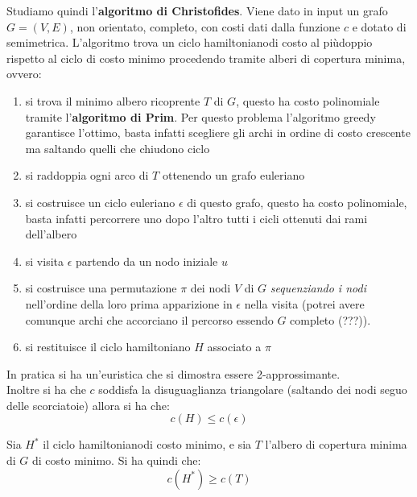 																      	Studiamo quindi l'\textbf{algoritmo di Christofides}. Viene dato in input un
																      	grafo $G=(V,E)$, non orientato, completo, con costi dati dalla funzione $c$ e
																      	dotato di semimetrica. 
																      	L'algoritmo trova un ciclo hamiltonianodi costo al piùdoppio rispetto al ciclo
																      	di costo minimo procedendo tramite alberi di copertura minima, ovvero:
																      	\begin{enumerate}
																      		\item si trova il minimo albero ricoprente $T$ di $G$, questo ha costo
																      		      polinomiale tramite l'\textbf{algoritmo di Prim}. Per questo problema
																      		      l’algoritmo greedy garantisce l’ottimo, basta infatti scegliere gli archi in
																      		      ordine di costo crescente ma saltando quelli che chiudono ciclo
																      		\item si raddoppia ogni arco di $T$ ottenendo un grafo euleriano
																      		\item si costruisce un ciclo euleriano $\epsilon$ di questo grafo, questo ha
																      		      costo polinomiale, basta infatti percorrere uno dopo l’altro tutti i cicli
																      		      ottenuti dai rami dell’albero 
																      		\item si visita $\epsilon$ partendo da un nodo iniziale $u$
																      		\item si costruisce una permutazione $\pi$ dei nodi $V$ di $G$
																      		      \textit{sequenziando i nodi} nell’ordine della loro prima apparizione in
																      		      $\epsilon$ nella visita (potrei avere comunque archi che accorciano il
																      		      percorso essendo $G$ completo (???)). 
																      		\item si restituisce il ciclo hamiltoniano $H$ associato a $\pi$
																      	\end{enumerate}
																      	In pratica si ha un'euristica che si dimostra essere 2-approssimante.\\
																      	Inoltre si ha che $c$ soddisfa la disuguaglianza triangolare (saltando dei nodi
																      	seguo delle scorciatoie) allora si ha che:
																      	\[c(H)\leq c(\epsilon)\]
																      	\begin{definizione}
																      		Sia $H^*$ il ciclo hamiltonianodi costo minimo, e sia $T$ l'albero di
																      		copertura minima di $G$ di costo minimo. Si ha quindi che:
																      		\[c(H^*)\geq c(T)\]
																      	\end{definizione}
